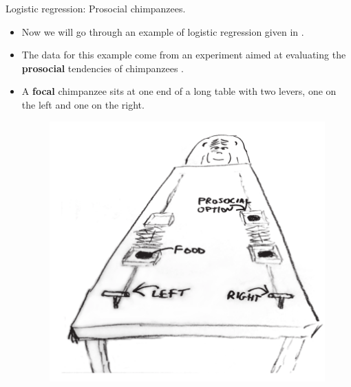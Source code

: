 \documentclass[handout]{beamer}
\begin{document}
\begin{frame}{Logistic regression: Prosocial chimpanzees.}
\scriptsize{
\begin{itemize}

\item Now we will go through an example of logistic regression given in \cite{mcelreath2020statistical}.

\item The data for this example come from an experiment aimed at evaluating the \textbf{prosocial} tendencies of chimpanzees \cite{silk2005chimpanzees}.

\item A \textbf{focal} chimpanzee sits at one end of a long table with two levers, one on the left and one on the right.


\begin{figure}[h!]
	\centering
	\includegraphics[scale=0.38]{pics/prosocial.png}
\end{figure}


\end{itemize}


}

\end{frame}
\end{document}
